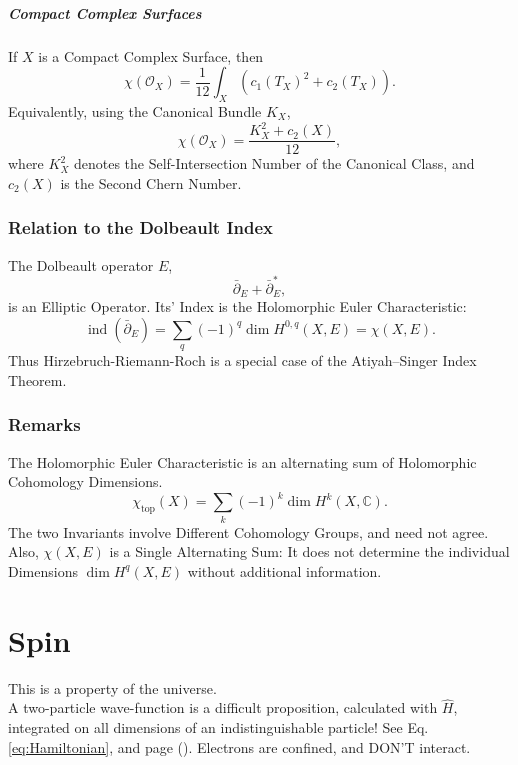 \documentclass[a4paper, 10pt, onepage]{elegantbook}
\begin{document}
{\paragraph{Compact Complex Surfaces}

If \(X\) is a Compact Complex Surface, then
\begin{equation}
\chi(\mathcal{O}_X)
=
\frac{1}{12}
\int_X\left(c_1(T_X)^2+c_2(T_X)\right).
\end{equation}
Equivalently, using the Canonical Bundle \(K_X\),
\begin{equation}
\chi(\mathcal{O}_X)
=
\frac{K_X^2+c_2(X)}{12},
\end{equation}
where \(K_X^2\) denotes the Self-Intersection Number of the Canonical Class, and \(c_2(X)\) is the Second Chern Number.

\subsection{Relation to the Dolbeault Index}

The Dolbeault operator \(E\), 
\[
\bar{\partial}_E+\bar{\partial}_E^*,
\]
is an Elliptic Operator. Its' Index is the Holomorphic Euler Characteristic:
\begin{equation}
\operatorname{ind}(\bar{\partial}_E)
=
\sum_q(-1)^q\dim H^{0,q}(X,E)
=
\chi(X,E).
\end{equation}
Thus Hirzebruch-Riemann-Roch is a special case of the Atiyah--Singer Index Theorem.

\subsection{Remarks}

The Holomorphic Euler Characteristic is an alternating sum of Holomorphic Cohomology Dimensions.
\[
\chi_{\mathrm{top}}(X)=\sum_k(-1)^k\dim H^k(X,\mathbb{C}).
\]
The two Invariants involve Different Cohomology Groups, and need not agree. Also, \(\chi(X,E)\) is a Single Alternating Sum: It does not determine the individual Dimensions \(\dim H^q(X,E)\) without additional information.



\chapter{Spin}

This is a property of the universe.  \\
A two-particle wave-function is a difficult proposition, calculated with $\hat H$, integrated on all dimensions of an indistinguishable particle! See Eq.~ \eqref{eq:Hamiltonian}, and page (\pageref{ch:Atiyah-Singer Index Theorem}). Electrons are confined, and DON'T interact.  \\



}
\end{document}
